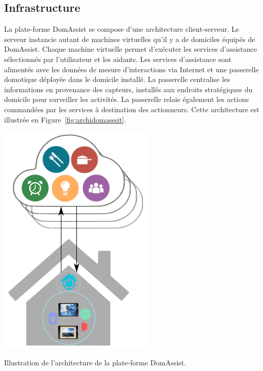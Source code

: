 \subsection{Infrastructure}
La plate-forme DomAssist se compose d'une architecture client-serveur.
Le serveur instancie autant de machines virtuelles qu'il y a de
domiciles équipés de DomAssist. 
Chaque machine virtuelle permet d'exécuter les services d'assistance sélectionnés par 
l'utilisateur et les aidants.
Les services d'assistance sont alimentés avec les données de mesure d'interactions via Internet et une 
passerelle domotique déployée dans le domicile installé.
La passerelle centralise les informations en provenance des capteurs, installés 
aux endroits stratégiques du domicile pour surveiller les activités.
La passerelle relaie également les actions commandées par les services à 
destination des actionneurs.
Cette architecture est illustrée en
Figure~\ref{fig:archidomasssit}. %
\begin{marginfigure}%
\includegraphics[width=\linewidth,totalheight=\textheight,keepaspectratio]{gfx/archi_domassist}
\caption{Illustration de l'architecture de la plate-forme DomAssist.}
\label{fig:archidomasssit}
\end{marginfigure} 

